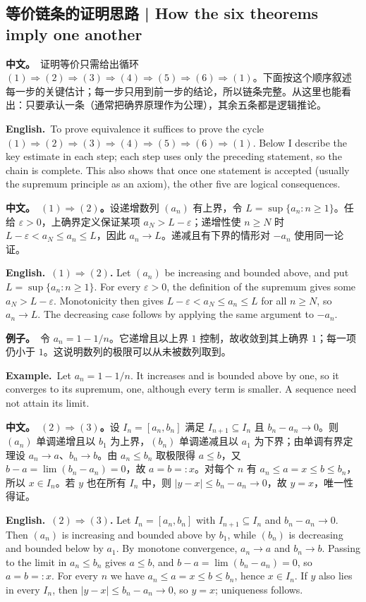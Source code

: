 \documentclass[UTF8,11pt,a4paper]{ctexart}
\newcommand{\BOTH}[2]{\par\noindent\textbf{中文。}\ #1\par\noindent\textbf{English.}\ #2\par}
\newcommand{\EX}[2]{\par\noindent\textbf{例子。}\ #1\par\noindent\textbf{Example.}\ #2\par}
\begin{document}
\subsection{等价链条的证明思路 | How the six theorems imply one another}
\BOTH{证明等价只需给出循环 $(1)\Rightarrow(2)\Rightarrow(3)\Rightarrow(4)\Rightarrow(5)\Rightarrow(6)\Rightarrow(1)$。下面按这个顺序叙述每一步的关键估计；每一步只用到前一步的结论，所以链条完整。从这里也能看出：只要承认一条（通常把确界原理作为公理），其余五条都是逻辑推论。}{To prove equivalence it suffices to prove the cycle $(1)\Rightarrow(2)\Rightarrow(3)\Rightarrow(4)\Rightarrow(5)\Rightarrow(6)\Rightarrow(1)$. Below I describe the key estimate in each step; each step uses only the preceding statement, so the chain is complete. This also shows that once one statement is accepted (usually the supremum principle as an axiom), the other five are logical consequences.}
\BOTH{\textbf{$(1)\Rightarrow(2)$。}设递增数列 $(a_n)$ 有上界，令 $L=\sup\{a_n:n\ge1\}$。任给 $\varepsilon>0$，上确界定义保证某项 $a_N>L-\varepsilon$；递增性使 $n\ge N$ 时 $L-\varepsilon<a_N\le a_n\le L$，因此 $a_n\to L$。递减且有下界的情形对 $-a_n$ 使用同一论证。}{\textbf{$(1)\Rightarrow(2)$.} Let $(a_n)$ be increasing and bounded above, and put $L=\sup\{a_n:n\ge1\}$. For every $\varepsilon>0$, the definition of the supremum gives some $a_N>L-\varepsilon$. Monotonicity then gives $L-\varepsilon<a_N\le a_n\le L$ for all $n\ge N$, so $a_n\to L$. The decreasing case follows by applying the same argument to $-a_n$.}
\EX{令 $a_n=1-1/n$。它递增且以上界 $1$ 控制，故收敛到其上确界 $1$；每一项仍小于 $1$。这说明数列的极限可以从未被数列取到。}{Let $a_n=1-1/n$. It increases and is bounded above by one, so it converges to its supremum, one, although every term is smaller. A sequence need not attain its limit.}
\BOTH{\textbf{$(2)\Rightarrow(3)$。}设 $I_n=[a_n,b_n]$ 满足 $I_{n+1}\subseteq I_n$ 且 $b_n-a_n\to0$。则 $(a_n)$ 单调递增且以 $b_1$ 为上界，$(b_n)$ 单调递减且以 $a_1$ 为下界；由单调有界定理设 $a_n\to a$、$b_n\to b$。由 $a_n\le b_n$ 取极限得 $a\le b$，又 $b-a=\lim(b_n-a_n)=0$，故 $a=b=:x$。对每个 $n$ 有 $a_n\le a=x\le b\le b_n$，所以 $x\in I_n$。若 $y$ 也在所有 $I_n$ 中，则 $|y-x|\le b_n-a_n\to0$，故 $y=x$，唯一性得证。}{\textbf{$(2)\Rightarrow(3)$.} Let $I_n=[a_n,b_n]$ with $I_{n+1}\subseteq I_n$ and $b_n-a_n\to0$. Then $(a_n)$ is increasing and bounded above by $b_1$, while $(b_n)$ is decreasing and bounded below by $a_1$. By monotone convergence, $a_n\to a$ and $b_n\to b$. Passing to the limit in $a_n\le b_n$ gives $a\le b$, and $b-a=\lim(b_n-a_n)=0$, so $a=b=:x$. For every $n$ we have $a_n\le a=x\le b\le b_n$, hence $x\in I_n$. If $y$ also lies in every $I_n$, then $|y-x|\le b_n-a_n\to0$, so $y=x$; uniqueness follows.}
\end{document}

